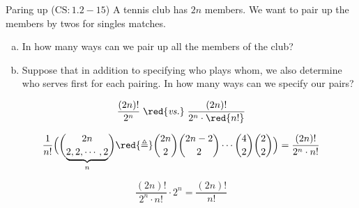 
\begin{frame}{}
  \begin{exampleblock}{Paring up ($\text{CS}: 1.2-15$)}
    A tennis club has $2n$ members. 
    We want to pair up the members by twos for singles matches. 
    
    \begin{enumerate}[(a)]
      \item In how many ways can we pair up all the members of the club? 
      \item Suppose that in addition to specifying who plays whom, 
	we also determine who serves first for each pairing. 
	In how many ways can we specify our pairs?
    \end{enumerate}
  \end{exampleblock}

  \pause
  \[
    \frac{(2n)!}{2^{n}} \;\red{\text{\emph{vs.}}}\; \frac{(2n)!}{2^n \cdot \red{n!}} %
  \]

  \pause
  \[
    \frac{1}{n!} \Big(\binom{2n}{\underbrace{2,2,\cdots,2}_{n}} \red{\triangleq} \binom{2n}{2} \binom{2n-2}{2} \cdots \binom{4}{2} \binom{2}{2}\Big) 
    = \frac{(2n)!}{2^{n} \cdot n!}
  \]

  \pause
  \[
    \frac{(2n)!}{2^{n} \cdot n!} \cdot 2^{n} = \frac{(2n)!}{n!}
  \]
\end{frame}

